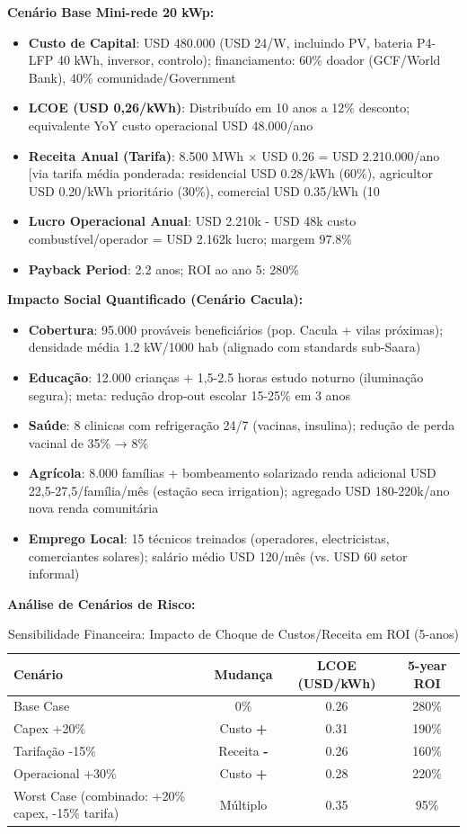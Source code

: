 \documentclass[12pt, a4paper]{article}
\begin{document}
\textbf{Cenário Base Mini-rede 20 kWp:}
\begin{itemize}
\item \textbf{Custo de Capital}: USD 480.000 (USD 24/W, incluindo PV, bateria P4-LFP 40 kWh, inversor, controlo); financiamento: 60\% doador (GCF/World Bank), 40\% comunidade/Government
\item \textbf{LCOE (USD 0,26/kWh)}: Distribuído em 10 anos a 12\% desconto; equivalente YoY custo operacional USD 48.000/ano
\item \textbf{Receita Anual (Tarifa)}: 8.500 MWh × USD 0.26 = USD 2.210.000/ano [via tarifa média ponderada: residencial USD 0.28/kWh (60\%), agricultor USD 0.20/kWh prioritário (30\%), comercial USD 0.35/kWh (10%
\item \textbf{Lucro Operacional Anual}: USD 2.210k - USD 48k custo combustível/operador = USD 2.162k lucro; margem 97.8\%
\item \textbf{Payback Period}: 2.2 anos; ROI ao ano 5: 280\%
\end{itemize}

\textbf{Impacto Social Quantificado (Cenário Cacula):}
\begin{itemize}
\item \textbf{Cobertura}: 95.000 prováveis beneficiários (pop. Cacula + vilas próximas); densidade média 1.2 kW/1000 hab (alignado com standards sub-Saara)
\item \textbf{Educação}: 12.000 crianças + 1,5-2.5 horas estudo noturno (iluminação segura); meta: redução drop-out escolar 15-25\% em 3 anos
\item \textbf{Saúde}: 8 clinicas com refrigeração 24/7 (vacinas, insulina); redução de perda vacinal de 35\% → 8\%
\item \textbf{Agrícola}: 8.000 famílias + bombeamento solarizado renda adicional USD 22,5-27,5/família/mês (estação seca irrigation); agregado USD 180-220k/ano nova renda comunitária
\item \textbf{Emprego Local}: 15 técnicos treinados (operadores, electricistas, comerciantes solares); salário médio USD 120/mês (vs. USD 60 setor informal)
\end{itemize}

\textbf{Análise de Cenários de Risco:}
\begin{table}[H]
\centering
\caption{Sensibilidade Financeira: Impacto de Choque de Custos/Receita em ROI (5-anos)}
\label{Tab:13}
\footnotesize
\begin{tabular}{|l|c|c|c|}
\hline
\textbf{Cenário} & \textbf{Mudança} & \textbf{LCOE (USD/kWh)} & \textbf{5-year ROI} \\
\hline
Base Case & 0\% & 0.26 & 280\% \\
\hline
Capex +20\% & Custo \textbf{+} & 0.31 & 190\% \\
\hline
Tarifação -15\% & Receita \textbf{-} & 0.26 & 160\% \\
\hline
Operacional +30\% & Custo \textbf{+} & 0.28 & 220\% \\
\hline
Worst Case (combinado: +20\% capex, -15\% tarifa) & Múltiplo & 0.35 & 95\% \\
\hline
\end{tabular}
\end{table}
\end{document}
